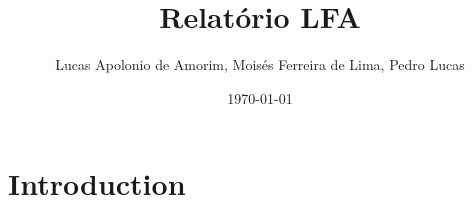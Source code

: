 \documentclass{article}
\title{Relatório LFA}
\author{Lucas Apolonio de Amorim, Moisés Ferreira de Lima, Pedro Lucas } %
\date{\today}
\begin{document}
\maketitle

\section{Introduction}
\end{document}
